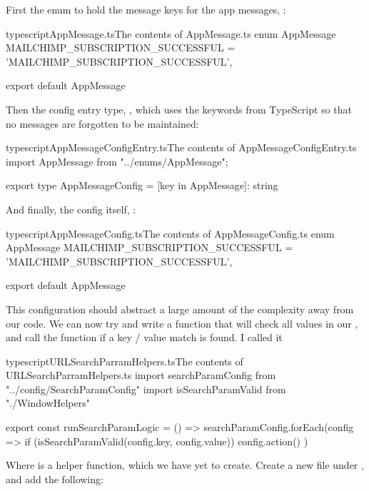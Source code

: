 \documentclass[paper=6in:9in,pagesize=pdftex,headinclude=on,footinclude=on,12pt,twoside]{scrbook}
\begin{document}
First the enum to hold the message keys for the app messages, :

\begin{codeInput}{typescript}{AppMessage.ts}{The contents of AppMessage.ts}
enum AppMessage {
  MAILCHIMP_SUBSCRIPTION_SUCCESSFUL = 'MAILCHIMP_SUBSCRIPTION_SUCCESSFUL',
}

export default AppMessage
\end{codeInput}

Then the config entry type,  , which uses the  keywords from TypeScript so that no messages are forgotten to be maintained:

\begin{codeInput}{typescript}{AppMessageConfigEntry.ts}{The contents of AppMessageConfigEntry.ts}
import AppMessage from "../enums/AppMessage";

export type AppMessageConfig = {
    [key in AppMessage]: string
}
\end{codeInput}

And finally, the config itself, :

\begin{codeInput}{typescript}{AppMessageConfig.ts}{The contents of AppMessageConfig.ts}
enum AppMessage {
  MAILCHIMP_SUBSCRIPTION_SUCCESSFUL = 'MAILCHIMP_SUBSCRIPTION_SUCCESSFUL',
}

export default AppMessage
\end{codeInput}

This configuration should abstract a large amount of the complexity away from our code. We can now try and write a function that will check all values in our , and call the  function if a key / value match is found. I called it 

\begin{codeInput}{typescript}{URLSearchParramHelpers.ts}{The contents of URLSearchParramHelpers.ts}
import { searchParamConfig } from "../config/SearchParamConfig"
import { isSearchParamValid } from "./WindowHelpers"

export const runSearchParamLogic = () => {
  searchParamConfig.forEach(config => {
    if (isSearchParamValid(config.key, config.value)) {
      config.action()
    }
  })
}  
\end{codeInput}

Where  is a helper function, which we have yet to create. Create a new file  under , and add the following:
\end{document}
